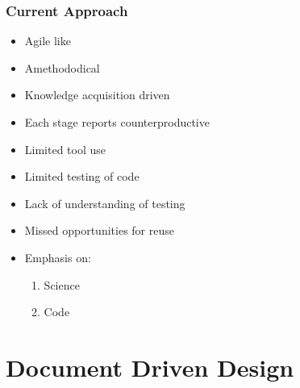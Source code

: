\documentclass{beamer}
\begin{document}
\begin{frame}

\frametitle{Current Approach}

\begin{itemize}
\item Agile like \citep{CarverEtAl2007}
\item Amethododical \citep{Kelly2013}
\item Knowledge acquisition driven \citep{Kelly2015}
\item Each stage reports counterproductive \citep{Roache1998}
\item Limited tool use \citep{Wilson2006}
\item Limited testing of code \citep{KellyAndSanders2008a}
\item Lack of understanding of testing \citep{Merali2010}
\item Missed opportunities for reuse \citep{Owen1998} 
\item Emphasis on:
\begin{enumerate}
\item Science~\citep{Kelly2007}
\item Code
\end{enumerate}
\end{itemize}

\end{frame}







\section[DDD]{Document Driven Design}
\end{document}
